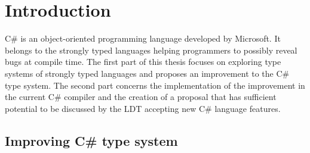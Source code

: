 \chapter{Introduction}

C\# is an object-oriented programming language developed by Microsoft. 
It belongs to the strongly typed languages helping programmers to possibly reveal bugs at compile time. 
The first part of this thesis focuses on exploring type systems of strongly typed languages and proposes an improvement to the C\# type system. 
The second part concerns the implementation of the improvement in the current C\# compiler and the creation of a proposal that has sufficient potential to be discussed by the \ac{LDT} accepting new C\# language features.

\section{Improving C\# type system}

